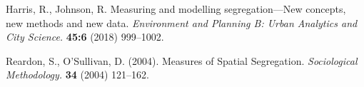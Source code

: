 \documentclass{article}
\theoremstyle{theorem}
\theoremstyle{definition}
\begin{document}
\begin{thebibliography}{1}
Harris, R., Johnson, R. Measuring and modelling segregation---New concepts, new methods and new data. \textit{Environment and Planning B: Urban Analytics and City Science.} \textbf{45:6} (2018) 999--1002.

Reardon, S., O'Sullivan, D. (2004). Measures of Spatial Segregation. \textit{Sociological Methodology.} \textbf{34} (2004) 121--162.

%
\end{thebibliography}

%
\vfill\eject
\end{document}
